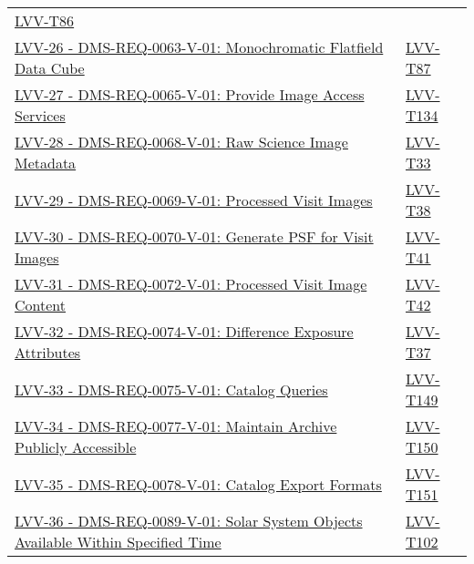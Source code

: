 \begin{longtable}[]{p{13cm}p{3cm}}
\protect\hyperlink{lvv-t86---verify-implementation-of-illumination-correction-frame-dms-req-0062}{LVV-T86}\tabularnewline
\href{https://jira.lsstcorp.org/browse/LVV-26}{LVV-26 -
DMS-REQ-0063-V-01: Monochromatic Flatfield Data Cube} &
\protect\hyperlink{lvv-t87---verify-implementation-of-monochromatic-flatfield-data-cube-dms-req-0063}{LVV-T87}\tabularnewline
\href{https://jira.lsstcorp.org/browse/LVV-27}{LVV-27 -
DMS-REQ-0065-V-01: Provide Image Access Services} &
\protect\hyperlink{lvv-t134---verify-implementatino-of-provide-image-access-services-dms-req-0065}{LVV-T134}\tabularnewline
\href{https://jira.lsstcorp.org/browse/LVV-28}{LVV-28 -
DMS-REQ-0068-V-01: Raw Science Image Metadata} &
\protect\hyperlink{lvv-t33---verify-implementation-of-raw-science-image-metadata-dms-req-0068}{LVV-T33}\tabularnewline
\href{https://jira.lsstcorp.org/browse/LVV-29}{LVV-29 -
DMS-REQ-0069-V-01: Processed Visit Images} &
\protect\hyperlink{lvv-t38---verify-implementation-of-processed-visit-images-dms-req-0069}{LVV-T38}\tabularnewline
\href{https://jira.lsstcorp.org/browse/LVV-30}{LVV-30 -
DMS-REQ-0070-V-01: Generate PSF for Visit Images} &
\protect\hyperlink{lvv-t41---verify-implementation-of-generate-psf-for-visit-images-dms-req-0070}{LVV-T41}\tabularnewline
\href{https://jira.lsstcorp.org/browse/LVV-31}{LVV-31 -
DMS-REQ-0072-V-01: Processed Visit Image Content} &
\protect\hyperlink{lvv-t42---verify-implementation-of-processed-visit-image-content-dms-req-0072}{LVV-T42}\tabularnewline
\href{https://jira.lsstcorp.org/browse/LVV-32}{LVV-32 -
DMS-REQ-0074-V-01: Difference Exposure Attributes} &
\protect\hyperlink{lvv-t37---verify-implementation-of-difference-exposure-attributes-dms-req-0074}{LVV-T37}\tabularnewline
\href{https://jira.lsstcorp.org/browse/LVV-33}{LVV-33 -
DMS-REQ-0075-V-01: Catalog Queries} &
\protect\hyperlink{lvv-t149---verify-implementation-of-catalog-queries-dms-req-0075}{LVV-T149}\tabularnewline
\href{https://jira.lsstcorp.org/browse/LVV-34}{LVV-34 -
DMS-REQ-0077-V-01: Maintain Archive Publicly Accessible} &
\protect\hyperlink{lvv-t150---verify-implementation-of-maintain-archive-publicly-accessible-dms-req-0077}{LVV-T150}\tabularnewline
\href{https://jira.lsstcorp.org/browse/LVV-35}{LVV-35 -
DMS-REQ-0078-V-01: Catalog Export Formats} &
\protect\hyperlink{lvv-t151---verify-iomplementation-of-catalog-export-formats-dms-req-0078}{LVV-T151}\tabularnewline
\href{https://jira.lsstcorp.org/browse/LVV-36}{LVV-36 -
DMS-REQ-0089-V-01: Solar System Objects Available Within Specified Time}
&
\protect\hyperlink{lvv-t102---verify-implementation-of-solar-system-objects-available-within-specified-time-dms-req-0089}{LVV-T102}\tabularnewline

\end{longtable}
